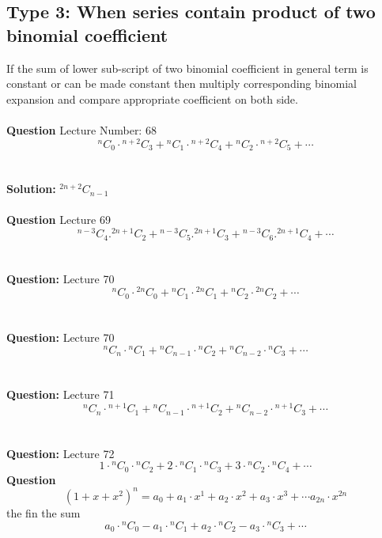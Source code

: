 \documentclass[12pt]{article}
\begin{document}
\subsection{Type 3: When series contain product of two binomial coefficient}
If the sum of lower sub-script of two binomial coefficient in general term is constant or can be made constant then multiply corresponding binomial expansion and compare appropriate coefficient on both side. \\
\\
\textbf{Question}
Lecture Number: 68\\
\[
{}^{n}C_{0}\cdot{}^{n+2}C_{3}+{}^{n}C_{1}\cdot{}^{n+2}C_{4}+{}^{n}C_{2}\cdot{}^{n+2}C_{5}+\cdots
\]\\
\\
\textbf{Solution: }
${}^{2n+2}C_{n-1}$ \\
\\
\textbf{Question}
Lecture 69\\
\[
{}^{n-3}C_{4}.{}^{2n+1}C_{2}+{}^{n-3}C_{5}.{}^{2n+1}C_{3}+{}^{n-3}C_{6}.{}^{2n+1}C_{4}+\cdots
\] \\
\\
\textbf{Question:}
Lecture 70
\[
{}^{n}C_{0}\cdot{}^{2n}C_{0}+{}^{n}C_{1}\cdot{}^{2n}C_{1}+{}^{n}C_{2}\cdot{}^{2n}C_{2}+\cdots
\]\\
\\
\textbf{Question:} Lecture 70
\[
{}^{n}C_{n}\cdot{}^{n}C_{1}+{}^{n}C_{n-1}\cdot{}^{n}C_{2}+{}^{n}C_{n-2}\cdot{}^{n}C_{3}+\cdots
\]\\
\\
\textbf{Question: }Lecture 71
\[
{}^{n}C_{n}\cdot{}^{n+1}C_{1}+{}^{n}C_{n-1}\cdot{}^{n+1}C_{2}+{}^{n}C_{n-2}\cdot{}^{n+1}C_{3}+\cdots
\]\\
\\
\textbf{Question: }Lecture 72
\[
{1}\cdot{}^{n}C_{0}\cdot{}^{n}C_{2}+
{2}\cdot{}^{n}C_{1}\cdot{}^{n}C_{3}+
{3}\cdot{}^{n}C_{2}\cdot{}^{n}C_{4}+\cdots
\]
\textbf{Question}\[
(1+x+x^2)^n = 
a_0+
a_1\cdot x^1+
a_2\cdot x^2+
a_3\cdot x^3+ \cdots
a_{2n}\cdot x^{2n}
\]
the fin the sum \[
a_0\cdot{}^{n}C_{0}-
a_1\cdot{}^{n}C_{1}+
a_2\cdot{}^{n}C_{2}-
a_3\cdot{}^{n}C_{3}+\cdots
\]

\newpage
\end{document}
